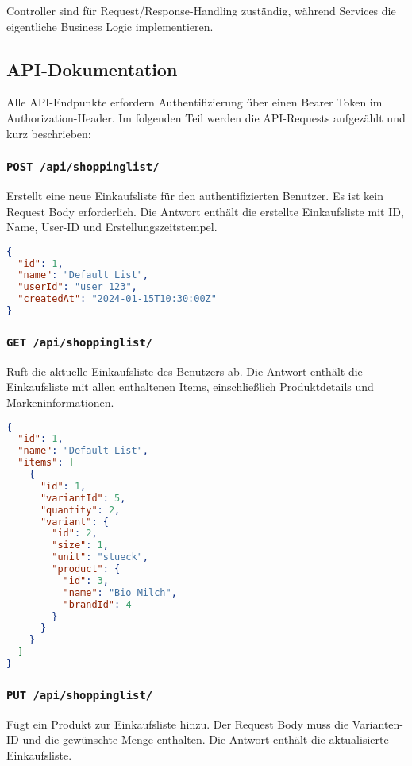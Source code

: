 Controller sind für Request/Response-Handling zuständig, während Services die eigentliche Business Logic implementieren.

\subsection{API-Dokumentation}

Alle API-Endpunkte erfordern Authentifizierung über einen Bearer Token im Authorization-Header. Im folgenden Teil werden die API-Requests aufgezählt und kurz beschrieben:

\subsubsection{\texttt{POST /api/shoppinglist/}}

Erstellt eine neue Einkaufsliste für den authentifizierten Benutzer. Es ist kein Request Body erforderlich. Die Antwort enthält die erstellte Einkaufsliste mit ID, Name, User-ID und Erstellungszeitstempel.

\begin{lstlisting}[language=JSON]
{
  "id": 1,
  "name": "Default List",
  "userId": "user_123",
  "createdAt": "2024-01-15T10:30:00Z"
}
\end{lstlisting}

\subsubsection{\texttt{GET /api/shoppinglist/}}

Ruft die aktuelle Einkaufsliste des Benutzers ab. Die Antwort enthält die Einkaufsliste mit allen enthaltenen Items, einschließlich Produktdetails und Markeninformationen.

\begin{lstlisting}[language=JSON]
{
  "id": 1,
  "name": "Default List",
  "items": [
    {
      "id": 1,
      "variantId": 5,
      "quantity": 2,
      "variant": {
        "id": 2,
        "size": 1,
        "unit": "stueck",
        "product": {
          "id": 3,
          "name": "Bio Milch",
          "brandId": 4
        }
      }
    }
  ]
}
\end{lstlisting}

\subsubsection{\texttt{PUT /api/shoppinglist/}}

Fügt ein Produkt zur Einkaufsliste hinzu. Der Request Body muss die Varianten-ID und die gewünschte Menge enthalten. Die Antwort enthält die aktualisierte Einkaufsliste.

